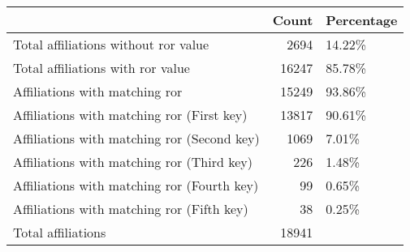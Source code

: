 \begin{tabular}{lrl}
\hline
                                             &   Count & Percentage   \\
\hline
 Total affiliations without ror value        &    2694 & 14.22\%       \\
 Total affiliations with ror value           &   16247 & 85.78\%       \\
 Affiliations with matching ror              &   15249 & 93.86\%       \\
 Affiliations with matching ror (First key)  &   13817 & 90.61\%       \\
 Affiliations with matching ror (Second key) &    1069 & 7.01\%        \\
 Affiliations with matching ror (Third key)  &     226 & 1.48\%        \\
 Affiliations with matching ror (Fourth key) &      99 & 0.65\%        \\
 Affiliations with matching ror (Fifth key)  &      38 & 0.25\%        \\
 Total affiliations                          &   18941 &              \\
\hline
\end{tabular}